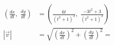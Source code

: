 \documentclass[preview]{standalone}
\begin{document}
\begin{align*}
\left(\frac{dx}{dt}, \; \frac{dy}{dt}\right) &= \left(\frac{6t}{(t^2 +1)^2}, \; \frac{-3t^2 + 3}{(t^2 + 1)^2}\right) \\ |\vec{v}| &= \sqrt{\left(\frac{dx}{dt}\right)^2 + \left(\frac{dy}{dt}\right)^2} =
\end{align*}
\end{document}
